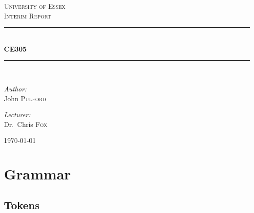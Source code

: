 \documentclass[a4paper,12pt]{article}
\begin{document}
\begin{titlepage}
    \newcommand{\HRule}{\rule{\linewidth}{0.5mm}}
    \begin{center}


        \textsc{\LARGE University of Essex}\\[1.5cm]

        \textsc{\Large Interim Report}\\[0.5cm]

        \HRule \\[0.4cm]
        { \huge \bfseries \gls{CE305} \\[0.4cm] }

        \HRule \\[1.5cm]

        \begin{minipage}{0.4\textwidth}
            \begin{flushleft} \large
                \emph{Author:}\\
                John \textsc{Pulford}
            \end{flushleft}
        \end{minipage}
        \begin{minipage}{0.4\textwidth}
            \begin{flushright} \large
                \emph{Lecturer:} \\
                Dr.~Chris \textsc{Fox}
            \end{flushright}
        \end{minipage}

        \vfill

        {\large \today}

    \end{center}
\end{titlepage}

\tableofcontents
\section{Grammar}
\setlength{\grammarparsep}{20pt plus 1pt minus 1pt} %
\setlength{\grammarindent}{12em} %
\subsection{Tokens}
\end{document}
